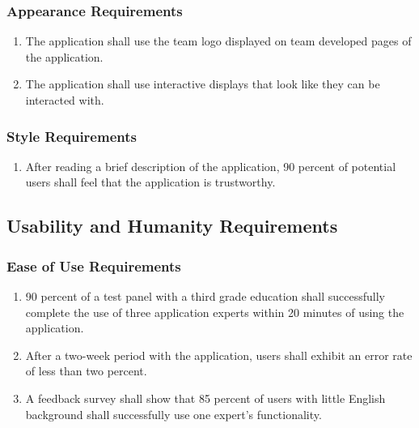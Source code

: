 \documentclass[titlepage]{article}
\begin{document}
\subsubsection{Appearance Requirements}
\label{ssub:appearance_requirements}
\begin{enumerate}[{LF}1. ]
	\item The application shall use the team logo displayed on team developed pages of the application. 
	\item The application shall use interactive displays that look like they can be interacted with. 
\end{enumerate}

\subsubsection{Style Requirements}
\label{ssub:style_requirements}
\begin{enumerate}[{LF}1. ]
	\item After reading a brief description of the application, 90 percent of potential users shall feel that the application is trustworthy.
	
	
\end{enumerate}


\subsection{Usability and Humanity Requirements}
\label{sub:usability_and_humanity_requirements}

\subsubsection{Ease of Use Requirements}
\label{ssub:ease_of_use_requirements}
\begin{enumerate}[{UH}1. ]
	\item 90 percent of a test panel with a third grade education shall successfully complete the use of three application experts within 20 minutes of using the application. 
	
	\item After a two-week period with the application, users shall exhibit an error rate of less than two percent.
	
	\item A feedback survey shall show that 85 percent of users with little English background shall successfully use one expert's functionality.      
	
	
\end{enumerate}
\end{document}
